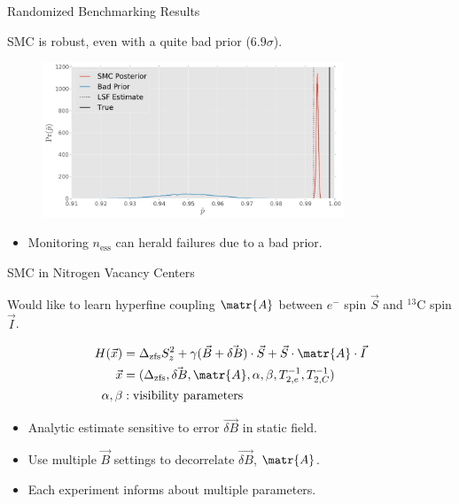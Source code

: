 \documentclass[xcolor=dvipsnames, compress]{beamer}
\begin{document}
\begin{frame}{Randomized Benchmarking Results}

    SMC is robust, even with a quite bad prior ($6.9\sigma$).

    \begin{figure}
        \centering
        \includegraphics[width=0.8\textwidth]{figures/bad-prior-distns}
    \end{figure}

    \pause
    \begin{itemize}
        \item Monitoring $n_{\text{ess}}$ can herald failures due to a bad prior.
    \end{itemize}

\end{frame}

\begin{frame}{SMC in Nitrogen Vacancy Centers}

  Would like to learn hyperfine coupling $\matr{A}$
  between $e^{-}$ spin $\vec{S}$ and ${}^{13}\text{C}$ spin $\vec{I}$.

  \begin{align*}
    H(\vec{x}) & = \Delta_{\text{zfs}} S_z^2 + \gamma (\vec{B} + \vec{\delta B}) \cdot \vec{S} + \vec{S} \cdot \matr{A} \cdot \vec{I} \\
    \vec{x} & = (\Delta_{\text{zfs}}, \vec{\delta B}, \matr{A}, \alpha, \beta, T_{2,e}^{-1}, T_{2,C}^{-1}) \\
    \alpha,\beta & : \text{visibility parameters}
  \end{align*}

  \pause

  \begin{itemize}
    \item Analytic estimate sensitive to error $\vec{\delta B}$ in static field.
    \item Use multiple $\vec{B}$ settings to decorrelate $\vec{\delta B}$, $\matr{A}$.
    \item Each experiment informs about multiple parameters.
  \end{itemize}

\end{frame}
\end{document}

